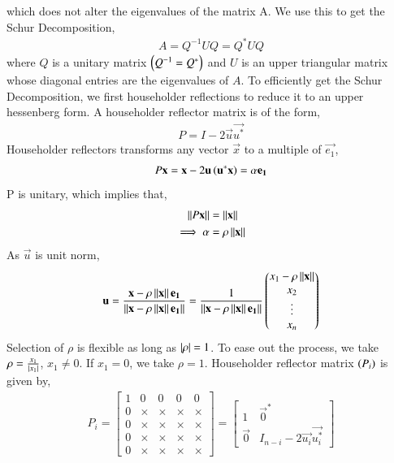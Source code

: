 \documentclass[journal]{IEEEtran}
\begin{document}
which does not alter the eigenvalues of the matrix A. 
\newline
We use this to get the Schur Decomposition,
\begin{align}
  A = Q^{-1}UQ = Q^{\ast}UQ
\end{align}
where $Q$ is a unitary matrix $\left(Q^{-1} = Q^{\ast}\right)$ and $U$ is an upper triangular matrix whose diagonal entries are the eigenvalues of $A$.
\newline
To efficiently get the Schur Decomposition, we first householder reflections to reduce it to an upper hessenberg form.
\newline
A householder reflector matrix is of the form,
\begin{align}
  P = I - 2\vec{u}\vec{u^{\ast}}
\end{align}
Householder reflectors transforms any vector $\vec{x}$ to a multiple of $\vec{e_1}$,
\begin{align}
  P\mathbf{x} = \mathbf{x} - 2\mathbf{u}\left(\mathbf{u^{\ast}}\mathbf{x}\right) = \alpha \mathbf{e_1}
\end{align}
P is unitary, which implies that,
\begin{align}
  \left\lVert P\mathbf{x}\right\rVert &= \left\lVert\mathbf{x}\right\rVert\\
  \implies \alpha &= \rho\left\lVert\mathbf{x}\right\rVert\\
\end{align}
As $\vec{u}$ is unit norm,
\begin{align}
  \mathbf{u} = \frac{\mathbf{x} - \rho\left\lVert\mathbf{x}\right\rVert\mathbf{e_1}}{\left\lVert\mathbf{x} - \rho\left\lVert\mathbf{x}\right\rVert\mathbf{e_1}\right\rVert} = \frac{1}{\left\lVert\mathbf{x} - \rho\left\lVert\mathbf{x}\right\rVert\mathbf{e_1}\right\rVert} \begin{pmatrix} x_1 - \rho\left\lVert\mathbf{x}\right\rVert\\x_2\\\vdots\\x_n\end{pmatrix}
\end{align}
Selection of $\rho$ is flexible as long as $\left\vert\rho\right\vert = 1$. To ease out the process, we take $\rho = \frac{x_1}{\left\vert x_1\right\vert}$, $x_1 \neq 0$. If $x_1 = 0$, we take $\rho = 1$.
\newline
Householder reflector matrix $\left(P_{i}\right)$ is given by,
\begin{align}
  P_{i} = \begin{bmatrix}
    1 & 0 & 0 & 0 & 0\\    
    0 & \times & \times & \times & \times\\
    0 & \times & \times & \times & \times\\
    0 & \times & \times & \times & \times\\
    0 & \times & \times & \times & \times
  \end{bmatrix} = \begin{bmatrix}
    1 & \vec{0}^{\ast}\\    
    \vec{0} & I_{n - i} - 2\vec{u_{i}}\vec{u_{i}^{\ast}}
  \end{bmatrix}
\end{align}
\end{document}
